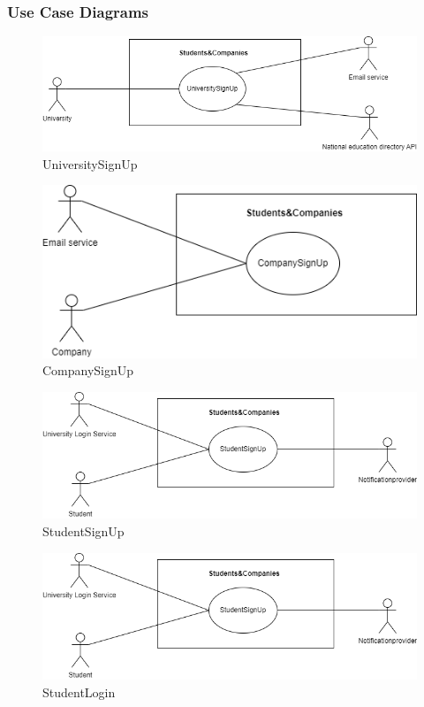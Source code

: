 \documentclass{article}
\begin{document}
\subsubsection{Use Case Diagrams}
\begin{figure}[H]
    \centering
    \includegraphics[scale = 0.45]{figures/UniversityLogin.drawio.png}
    \caption{UniversitySignUp}
    \centering
\end{figure}
\begin{figure}[H]
    \centering
    \includegraphics[scale = 0.45]{figures/use_case_1-CompanyLogin.drawio.png}
    \caption{CompanySignUp}
    \centering
\end{figure}
\begin{figure}[H]
    \centering
    \includegraphics[scale = 0.45]{figures/use_case_1-StudentLogin.drawio.png}
    \caption{StudentSignUp}
    \centering
\end{figure}
\begin{figure}[H]
    \centering
    \includegraphics[scale = 0.45]{figures/use_case_1-StudentLogin.drawio.png}
    \caption{StudentLogin}
    \centering
\end{figure}
\end{document}
